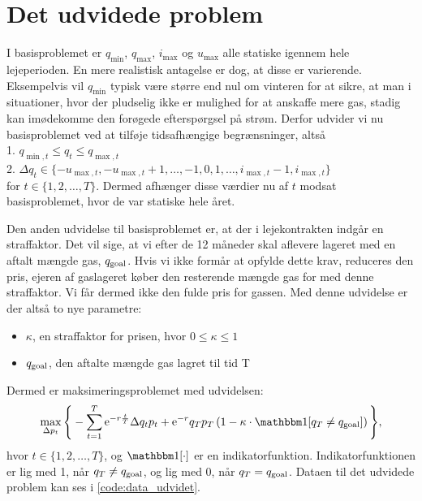 \section{Det udvidede problem} \label{kap:udvidet_problem}

I basisproblemet er $q_{\min}$, $q_{\max}$, $i_{\max}$ og $u_{\max}$ alle  statiske igennem hele lejeperioden. En mere realistisk antagelse er dog, at disse er varierende. Eksempelvis vil $q_{\min}$ typisk være større end nul om vinteren for at sikre, at man i situationer, hvor der pludselig ikke er mulighed for at anskaffe mere gas, stadig kan imødekomme den forøgede efterspørgsel på strøm. Derfor udvider vi nu basisproblemet ved at tilføje tidsafhængige begrænsninger, altså\\
1. $q_{\min,t} \leq q_{t} \leq q_{\max,t}$ \\
2. $\Delta q_{t} \in \{-u_{\max,t}, -u_{\max,t} + 1, \dotsc, -1, 0, 1, \dotsc, i_{\max,t} -1, i_{\max,t} \}$ \\
for $t \in \{1,2,\dotsc,T \}$. Dermed afhænger disse værdier nu af $t$ modsat basisproblemet, hvor de var statiske hele året. 

Den anden udvidelse til basisproblemet er, at der i lejekontrakten indgår en straffaktor. Det vil sige, at vi efter de 12 måneder skal aflevere lageret med en aftalt mængde gas, $q_{\textrm{goal}}$. Hvis vi ikke formår at opfylde dette krav, reduceres den pris, ejeren af gaslageret køber den resterende mængde gas for med denne straffaktor. Vi får dermed ikke den fulde pris for gassen. Med denne udvidelse er der altså to nye parametre:
\begin{itemize}
\item $\kappa$, en straffaktor for prisen, hvor $0 \leq \kappa \leq 1$
\item $q_{\textrm{goal}}$, den aftalte mængde gas lagret til tid T
\end{itemize}
Dermed er maksimeringsproblemet med udvidelsen:
\begin{equation}
\max_{\Delta p_{t}} \Bigg\{ -\sum_{t=1}^{T} \mathrm{e}^{-r\frac{t}{T}} \Delta q_{t} p_{t}+ \mathrm{e}^{-r}q_{T}p_{T} \left (1- \kappa \cdot \ind [q_{T} \neq q_{\goal}] \right )  \Bigg\}, 
\end{equation}
hvor $t \in \{1,2,\dotsc,T \}$, og $\ind [\cdot]$ er en indikatorfunktion. Indikatorfunktionen er lig med 1, når $q_{T} \neq q_{\textrm{goal}}$, og lig med 0, når $q_{T} = q_{\textrm{goal}}$. Dataen til det udvidede problem kan ses i \autoref{code:data_udvidet}.